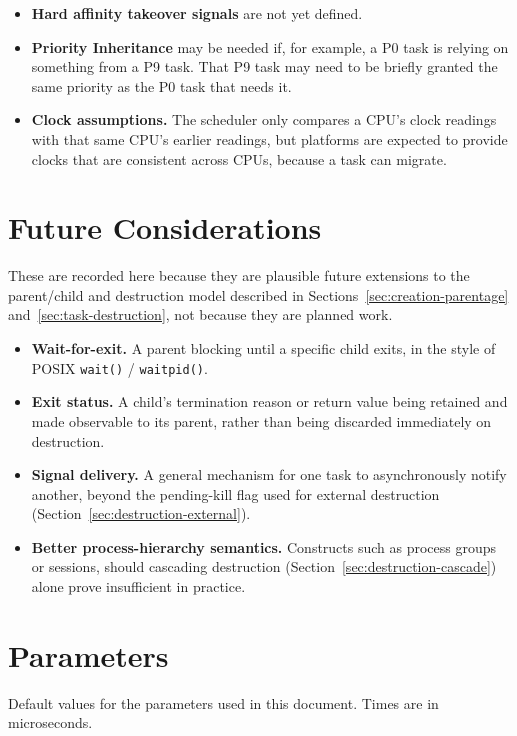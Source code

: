 \documentclass[11pt]{article}
\begin{document}
\begin{itemize}
	\item \textbf{Hard affinity takeover signals} are not yet defined.
	\item \textbf{Priority Inheritance} may be needed if, for example, a P0 task is relying on something from a P9 task. That P9 task may need to be briefly granted the same priority as the P0 task that needs it.
	\item \textbf{Clock assumptions.} The scheduler only compares a CPU's clock readings with that same CPU's earlier readings, but platforms are expected to provide clocks that are consistent across CPUs, because a task can migrate.
\end{itemize}

\section{Future Considerations}
\label{sec:future-considerations}

These are recorded here because they are plausible future extensions to the parent/child and destruction model described in Sections~\ref{sec:creation-parentage} and~\ref{sec:task-destruction}, not because they are planned work.

\begin{itemize}
	\item \textbf{Wait-for-exit.} A parent blocking until a specific child exits, in the style of POSIX \texttt{wait()} / \texttt{waitpid()}.
	\item \textbf{Exit status.} A child's termination reason or return value being retained and made observable to its parent, rather than being discarded immediately on destruction.
	\item \textbf{Signal delivery.} A general mechanism for one task to asynchronously notify another, beyond the pending-kill flag used for external destruction (Section~\ref{sec:destruction-external}).
	\item \textbf{Better process-hierarchy semantics.} Constructs such as process groups or sessions, should cascading destruction (Section~\ref{sec:destruction-cascade}) alone prove insufficient in practice.
\end{itemize}

\section{Parameters}
\label{sec:tunables}

Default values for the parameters used in this document. Times are in microseconds.
\end{document}

